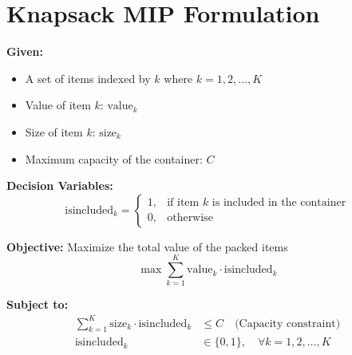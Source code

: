 \documentclass{article}
\begin{document}
\section*{Knapsack MIP Formulation}

\textbf{Given:}
\begin{itemize}
    \item A set of items indexed by \( k \) where \( k = 1, 2, \ldots, K \)
    \item Value of item \( k \): \( \text{value}_k \)
    \item Size of item \( k \): \( \text{size}_k \)
    \item Maximum capacity of the container: \( C \)
\end{itemize}

\textbf{Decision Variables:}
\[
\text{isincluded}_k =
\begin{cases} 
1, & \text{if item } k \text{ is included in the container} \\
0, & \text{otherwise}
\end{cases}
\]

\textbf{Objective:} Maximize the total value of the packed items
\[
\max \sum_{k=1}^K \text{value}_k \cdot \text{isincluded}_k
\]

\textbf{Subject to:}
\begin{align}
\sum_{k=1}^K \text{size}_k \cdot \text{isincluded}_k & \leq C \quad \text{(Capacity constraint)} \\
\text{isincluded}_k & \in \{0, 1\}, \quad \forall k = 1, 2, \ldots, K
\end{align}
\end{document}
